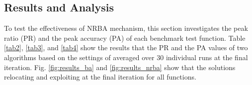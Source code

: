\documentclass[conference]{IEEEtran}
\begin{document}

\subsection{Results and Analysis}
To test the effectiveness of NRBA mechanism, this section investigates the peak ratio (PR) and the peak accuracy (PA) of each benchmark test function. Table \ref{tab2}, \ref{tab3}, and \ref{tab4} show the results that the PR and the PA values of two algorithms based on the settings of averaged over 30 individual runs at the final iteration. Fig. \ref{fig:results_ba} and \ref{fig:results_nrba} show that the solutions relocating and exploiting at the final iteration for all functions.
\end{document}
